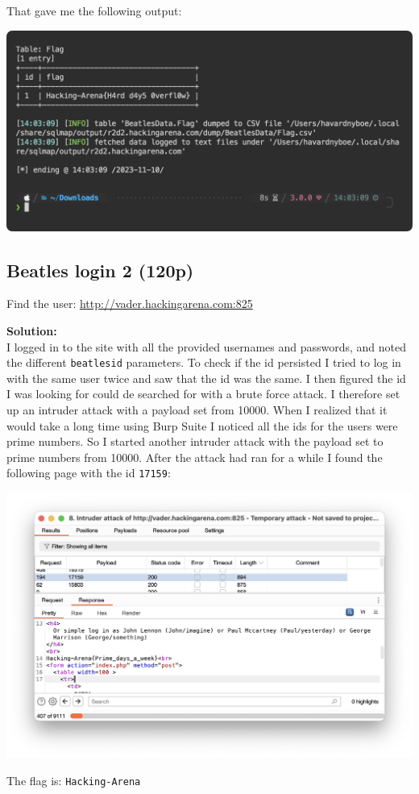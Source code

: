 That gave me the following output:

\begin{center}
    \includegraphics[width=15cm]{img/Web hacking/Beatles song catalogue 2/Screenshot 2023-11-10 at 14.09.55.png}
\end{center}

\newpage
\subsection{Beatles login 2 (120p)}
Find the user: \url{http://vader.hackingarena.com:825}

\textbf{Solution:}\\
I logged in to the site with all the provided usernames and passwords, and noted the different \texttt{beatlesid} parameters. 
To check if the id persisted I tried to log in with the same user twice and saw that the id was the same. 
I then figured the id I was looking for could de searched for with a brute force attack. 
I therefore set up an intruder attack with a payload set from 10000. 
When I realized that it would take a long time using Burp Suite I noticed all the ids for the users were prime numbers. 
So I started another intruder attack with the payload set to prime numbers from 10000. After the attack had ran for a while I found the following page with the id \texttt{17159}:

\begin{center}
    \includegraphics[width=16cm]{img/Web hacking/Beatles login 2/Screenshot 2023-11-09 at 17.33.16.png}
\end{center}

The flag is: \texttt{Hacking-Arena}